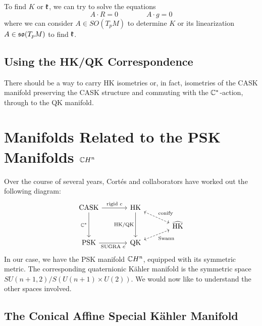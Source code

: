 \documentclass[parskip=half]{scrartcl}
\begin{document}
To find $K$ or $\mathfrak{k}$, we can try to solve the equations
\begin{equation*}
	A \cdot R=0 \qquad \qquad A\cdot g=0
\end{equation*}
where we can consider $A\in SO(T_p M)$ to determine $K$ or its linearization $A\in \mathfrak{so}(T_p M)$ to find $\mathfrak{k}$.

\subsection{Using the HK/QK Correspondence}

There should be a way to carry HK isometries or, in fact, isometries of the CASK manifold preserving the CASK structure and commuting with the $\mathbb{C}^*$-action, through to the QK manifold.

\section{Manifolds Related to the PSK Manifolds \texorpdfstring{$\mathbb{C} H^n$}{Complex Hyperbolic Space}}


Over the course of several years, Cort\'es and collaborators have worked out the following diagram:
\begin{equation*}
	\begin{tikzcd}[row sep=small,column sep=large]
		\text{CASK} \ar[r,"\text{rigid }c"] \ar[dd,"\C^*"'] & \text{HK} 
		\ar[dd,"\text{HK/QK}"'] \ar[dr,dashed, leftrightarrow,"\text{conify}"] & \\
		& & \widehat{\text{HK}}\\
		\text{PSK} \ar[r,"\text{SUGRA }c"'] & \text{QK} \ar[ur,leftrightarrow,dashed,"\text{Swann}"'] &
	\end{tikzcd}
\end{equation*}
In our case, we have the PSK manifold $\mathbb{C} H^n$, equipped with its symmetric metric. The corresponding quaternionic K\"ahler manifold is the symmetric space $SU(n+1,2)/S(U(n+1)\times U(2))$. We would now like to understand the other spaces involved.

\subsection{The Conical Affine Special K\"ahler Manifold}
\end{document}
